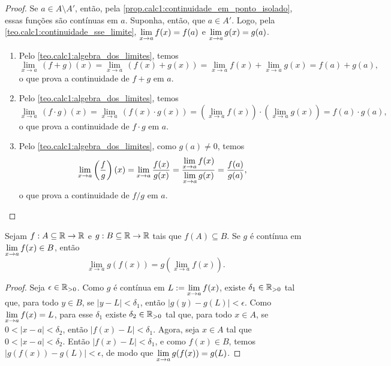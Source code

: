 \begin{proof}
    Se $a \in A \setminus A'$, então, pela \cref{prop.calc1:continuidade_em_ponto_isolado}, essas funções são contínuas em $a$. Suponha, então, que $a \in A'$. Logo, pela \cref{teo.calc1:continuidade_sse_limite}, $\displaystyle \lim_{x \to a} f(x) = f(a)$ e $\displaystyle \lim_{x \to a} g(x) = g(a)$.
        \begin{enumerate}[leftmargin=*, align=left, label=\textbf{(\alph*)}]
            \item Pelo \cref{teo.calc1:algebra_dos_limites}, temos 
                \[
                    \lim_{x \to a} \, (f+g)(x) = \lim_{x \to a} \, (f(x) + g(x)) = \lim_{x \to a} f(x) + \lim_{x \to a} g(x) = f(a) + g(a),
                \]
            o que prova a continuidade de $f+g$ em $a$. \blackproof
            \item Pelo \cref{teo.calc1:algebra_dos_limites}, temos 
                \[
                    \lim_{x \to a} \, (f \cdot g)(x) = \lim_{x \to a} \, (f(x) \cdot g(x)) = \left( \lim_{x \to a} f(x) \right) \cdot \left( \lim_{x \to a} g(x) \right) = f(a) \cdot g(a),
                \]
            o que prova a continuidade de $f \cdot g$ em $a$. \blackproof
            \item Pelo \cref{teo.calc1:algebra_dos_limites}, como $g(a) \neq 0$, temos 
                \[
                    \lim_{x \to a}  \left(\dfrac{f}{g} \right)(x) = \lim_{x \to a} \dfrac{f(x)}{g(x)} = \dfrac{\displaystyle \lim_{x \to a} f(x)}{\displaystyle \lim_{x \to a} g(x)} = \dfrac{f(a)}{g(a)}, \qedhere
                \]
            o que prova a continuidade de $f / g$ em $a$. \blackproof
        \end{enumerate}
\end{proof}

\begin{theorem} \label{teo.calc1:limite_da_composta}
    Sejam $f : A \subseteq \mathbb{R} \to \mathbb{R}$ e $g : B \subseteq \mathbb{R} \to \mathbb{R}$ tais que $f(A) \subseteq B$. Se $g$ é contínua em $\displaystyle \lim_{x \to a} f(x) \in B$, então
        \[
            \lim_{x \to a} g(f(x)) = g \left(\lim_{x \to a} f(x) \right).
        \]
\end{theorem}

\begin{proof}
    Seja $\epsilon \in \mathbb{R}_{>0}$. Como $g$ é contínua em $\displaystyle L := \lim_{x \to a} f(x)$, existe $\delta_1 \in \mathbb{R}_{>0}$ tal que, para todo $y \in B$, se $|y-L|<\delta_1$, então $|g(y) - g(L)| < \epsilon$. Como $\displaystyle \lim_{x \to a} f(x) = L$, para esse $\delta_1$ existe $\delta_2 \in \mathbb{R}_{>0}$ tal que, para todo $x \in A$, se $0<|x-a|<\delta_2$, então $|f(x) - L| < \delta_1$. Agora, seja $x \in A$ tal que $0<|x-a|<\delta_2$. Então $|f(x) - L| < \delta_1$, e como $f(x) \in B$, temos $|g(f(x)) - g(L)| < \epsilon$, de modo que $\displaystyle \lim_{x \to a} g(f(x)) = g(L)$. \blackproof
\end{proof}

